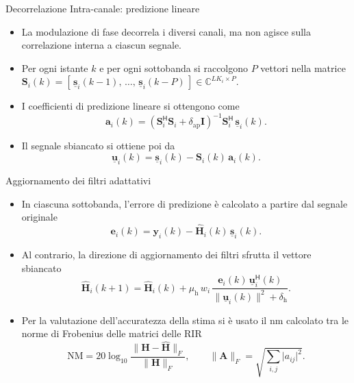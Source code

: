 \documentclass[aspectratio=169,xcolor=dvipsnames]{beamer}
\begin{document}
\begin{frame}{Decorrelazione Intra-canale: predizione lineare}
    \begin{itemize}
        \item La modulazione di fase decorrela i diversi canali, ma non agisce sulla correlazione interna a ciascun segnale.
        \item Per ogni istante $k$ e per ogni sottobanda si raccolgono $P$ vettori nella matrice  $\mathbf{S}_i(k) = [\,\underline{\mathbf{s}}_i(k-1),\, \dots,\, \underline{\mathbf{s}}_i(k-P)\,] \in \mathbb{C}^{LK_i \times P}$.
        \item I coefficienti di predizione lineare si ottengono come
            \begin{equation}
		\mathbf{a}_i(k) = \left(\mathbf{S}_i^{\mathsf{H}}\mathbf{S}_i + \delta_{\mathrm{ap}}\mathbf{I}\right)^{-1} \mathbf{S}_i^{\mathsf{H}}\, \underline{\mathbf{s}}_i(k).
		\label{eq:pred_coeff}
	        \end{equation}
        \item Il segnale sbiancato si ottiene poi da
            \begin{equation}
		\underline{\mathbf{u}}_i(k) = \underline{\mathbf{s}}_i(k) - \mathbf{S}_i(k)\,\mathbf{a}_i(k).
		\label{eq:whitened}
	\end{equation}
    \end{itemize}
\end{frame}

\begin{frame}{Aggiornamento dei filtri adattativi}
    \begin{itemize}
        \item In ciascuna sottobanda, l'errore di predizione è calcolato a partire dal segnale originale
        \begin{equation}
		\mathbf{e}_i(k) = \mathbf{y}_i(k) - \hat{\mathbf{H}}_i(k)\,\underline{\mathbf{s}}_i(k).
		\label{eq:errore}
	    \end{equation}
        \item Al contrario, la direzione di aggiornamento dei filtri sfrutta il vettore sbiancato
            \begin{equation}
		\hat{\mathbf{H}}_i(k+1) = \hat{\mathbf{H}}_i(k) + \mu_{\mathrm{h}}\, w_i\,
		\frac{\mathbf{e}_i(k)\,\underline{\mathbf{u}}_i^{\mathsf{H}}(k)}{\lVert\underline{\mathbf{u}}_i(k)\rVert^2 + \delta_{\mathrm{h}}}.
		\label{eq:update}
	    \end{equation}
        \item Per la valutazione dell'accuratezza della stima si è usato il \ac{nm} calcolato tra le norme di Frobenius delle matrici delle RIR\begin{equation}
		\mathrm{NM} = 20\log_{10} \frac{\lVert\mathbf{H}-\hat{\mathbf{H}}\rVert_F}{\lVert\mathbf{H}\rVert_F},
		\qquad
		\lVert\mathbf{A}\rVert_F=\sqrt{\sum_{i,j} \lvert a_{ij}\rvert^2}.
		\label{eq:nm}
	\end{equation}
    \end{itemize}
\end{frame}
\end{document}
